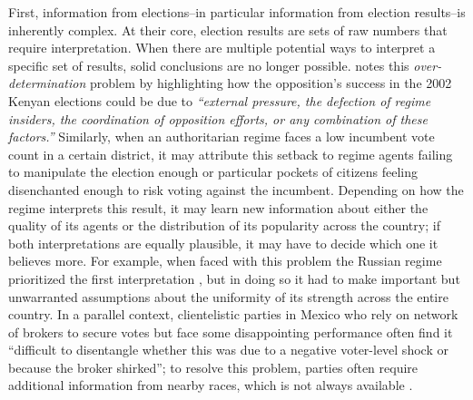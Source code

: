 \documentclass[12pt]{article}
\newcommand{\1}{\mathbbm{1}}
\begin{document}
First, information from elections--in particular information from election results--is inherently complex. At their core, election results are sets of raw numbers that require interpretation. When there are multiple potential ways to interpret a specific set of results, solid conclusions are no longer possible. \citet[][461]{Gandhi2015} notes this \textit{over-determination} problem by highlighting how the opposition's success in the 2002 Kenyan elections could be due to \textit{``external pressure, the defection of regime insiders, the coordination of opposition efforts, or any combination of these factors.''} Similarly, when an authoritarian regime faces a low incumbent vote count in a certain district, it may attribute this setback to regime agents failing to manipulate the election enough or particular pockets of citizens feeling disenchanted enough to risk voting against the incumbent. Depending on how the regime interprets this result, it may learn new information about either the quality of its agents or the distribution of its popularity across the country; if both interpretations are equally plausible, it may have to decide which one it believes more. For example, when faced with this problem the Russian regime prioritized the first interpretation \citep[][136]{Myagkov2009}, but in doing so it had to make important but unwarranted assumptions about the uniformity of its strength across the entire country. In a parallel context, clientelistic parties in Mexico who rely on network of brokers to secure votes but face some disappointing performance often find it ``difficult to disentangle whether this was due to a negative voter-level shock or because the broker shirked''; to resolve this problem, parties often require additional information from nearby races, which is not always available \citep[][168]{Larreguy2016}.
\end{document}
